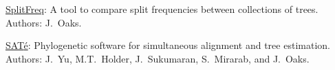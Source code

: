 \myHangIndent
\href{https://github.com/joaks1/SplitFreq}{SplitFreq}:
    A tool to compare split frequencies between collections of trees.
    Authors: J.\ Oaks.

\myHangIndent
\href{http://phylo.bio.ku.edu/software/sate/sate.html}{{SAT}\'{e}}:
    Phylogenetic software for simultaneous alignment and tree estimation.
    Authors: J.\ Yu, M.T.\ Holder, J.\ Sukumaran, S.\ Mirarab, and J.\ Oaks.

